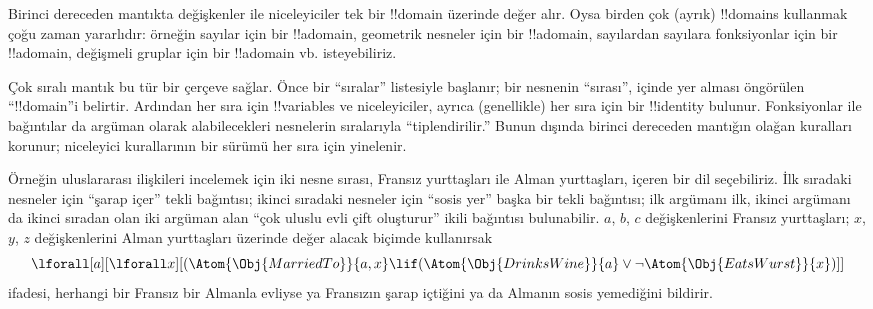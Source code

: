 



Birinci dereceden mantıkta değişkenler ile niceleyiciler tek bir !!{domain}
üzerinde değer alır. Oysa birden çok (ayrık) !!{domain}s kullanmak çoğu zaman
yararlıdır: örneğin sayılar için bir !!a{domain}, geometrik nesneler için bir
!!a{domain}, sayılardan sayılara fonksiyonlar için bir !!a{domain}, değişmeli
gruplar için bir !!a{domain} vb. isteyebiliriz.

Çok sıralı mantık bu tür bir çerçeve sağlar. Önce bir ``sıralar'' listesiyle
başlanır; bir nesnenin ``sırası'', içinde yer alması öngörülen ``!!{domain}''i
belirtir. Ardından her sıra için !!{variable}s ve niceleyiciler, ayrıca
(genellikle) her sıra için bir !!{identity} bulunur. Fonksiyonlar ile
bağıntılar da argüman olarak alabilecekleri nesnelerin sıralarıyla
``tiplendirilir.'' Bunun dışında birinci dereceden mantığın olağan kuralları
korunur; niceleyici kurallarının bir sürümü her sıra için yinelenir.

Örneğin uluslararası ilişkileri incelemek için iki nesne sırası, Fransız
yurttaşları ile Alman yurttaşları, içeren bir dil seçebiliriz. İlk sıradaki
nesneler için ``şarap içer'' tekli bağıntısı; ikinci sıradaki nesneler için
``sosis yer'' başka bir tekli bağıntısı; ilk argümanı ilk, ikinci argümanı da
ikinci sıradan olan iki argüman alan ``çok uluslu evli çift oluşturur'' ikili
bağıntısı bulunabilir. $a$, $b$, $c$ değişkenlerini Fransız yurttaşları;
$x$, $y$, $z$ değişkenlerini Alman yurttaşları üzerinde değer alacak biçimde
kullanırsak
\[
\lforall[a][\lforall x][(\Atom{\Obj{MarriedTo}}{a,x} \lif
(\Atom{\Obj{DrinksWine}}{a} \lor \lnot \Atom{\Obj{EatsWurst}}{x})]]
\]
ifadesi, herhangi bir Fransız bir Almanla evliyse ya Fransızın şarap içtiğini
ya da Almanın sosis yemediğini bildirir.

